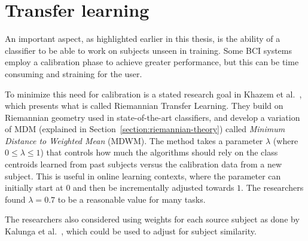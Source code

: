 \section{Transfer learning}\label{section:transfer-learning}

An important aspect, as highlighted earlier in this thesis, is the ability of a classifier to be able to work on subjects unseen in training. Some BCI systems employ a calibration phase to achieve greater performance, but this can be time consuming and straining for the user. 

To minimize this need for calibration is a stated research goal in Khazem et al.~\cite{khazem_minimizing_2021}, which presents what is called Riemannian Transfer Learning. They build on Riemannian geometry used in state-of-the-art classifiers, and develop a variation of MDM (explained in Section~\ref{section:riemannian-theory}) called \emph{Minimum Distance to Weighted Mean} (MDWM). The method takes a parameter $\lambda$ (where $0 \leq \lambda \leq 1$) that controls how much the algorithms should rely on the class centroids learned from past subjects versus the calibration data from a new subject. This is useful in online learning contexts, where the parameter can initially start at $0$ and then be incrementally adjusted towards $1$. The researchers found $\lambda = 0.7$ to be a reasonable value for many tasks. 

The researchers also considered using weights for each source subject as done by Kalunga et al.~\cite{kalunga_transfer_2018}, which could be used to adjust for subject similarity.

